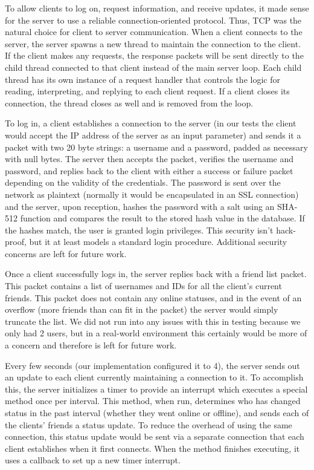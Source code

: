 To allow clients to log on, request information, and receive updates, it made
sense for the server to use a reliable connection-oriented protocol. Thus, TCP was the 
natural
choice for client to server communication. When a client connects to the server, the server spawns a new thread to maintain
the connection to the client. If the client makes any requests, the response packets will 
be sent
directly to the child thread connected to that client instead of the main server loop. Each child thread has its own
instance of a request handler that controls the logic for reading, interpreting, and replying
to each client request. If a client closes its connection, the thread closes as well and is
removed from the loop. 

To log in, a client establishes a connection to the server (in our tests
the client would accept the IP address of the server as an input parameter) and sends it
a packet with two 20 byte strings: a username and a password, padded as necessary with
null bytes. The server then accepts the packet, verifies the username and password, and
replies back to the client with either a success or failure packet depending on the
validity of the credentials. The password is sent over the network as plaintext (normally
it would be encapsulated in an SSL connection) and the server, upon reception, hashes
the password with a salt using an SHA-512 function and compares the result to the stored hash value 
in the database. If the hashes match, the user is granted login privileges. This
security isn't hack-proof, but it at least models a standard login procedure.  Additional
security concerns are left for future work.

Once a client successfully logs in, the server replies back with a friend list packet.
This packet contains a list of usernames and IDs for all the client's current
friends.
This packet does not contain any online statuses, and in the event of an overflow (more friends than can fit in the packet) the server would simply truncate
the list. We did not run into any issues with this in testing because we only had 2
users, but in a real-world environment this certainly would be more of a concern and 
therefore is left for future work.

Every few seconds (our implementation configured it to 4), the server sends out an
update to each client currently maintaining a connection to it. To accomplish this,
the server initializes a timer to provide an interrupt which executes a special method
once per interval. This method, when run, determines who has changed status in the past
interval (whether they went online or offline), and sends each of the clients' friends a 
status update. To reduce the overhead of using the same
connection, this status update would be sent via a separate connection that each client
establishes when it first connects. When the method finishes executing, it uses a callback
to set up a new timer interrupt. 

